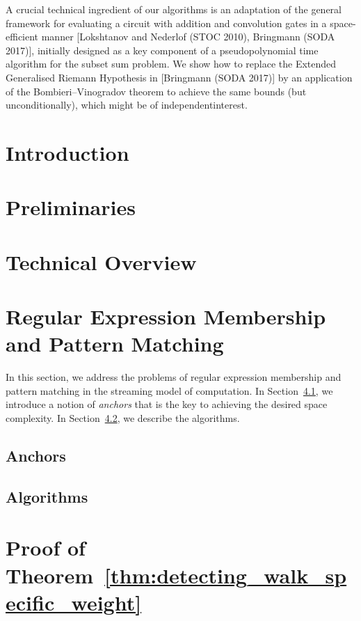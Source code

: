 \begin{small}
A crucial technical ingredient of our algorithms is an adaptation of the general framework for evaluating a circuit with addition and convolution gates in a space-efficient manner [Lokshtanov and Nederlof (STOC 2010), Bringmann (SODA 2017)], initially designed as a key component of a pseudopolynomial time algorithm for the subset sum problem. We show how to replace the Extended Generalised Riemann Hypothesis in [Bringmann (SODA 2017)] by an application of the Bombieri--Vinogradov theorem to achieve the same bounds (but unconditionally), which might be of independentinterest.
\end{small}

\section{Introduction}
\label{regexp:sec:introduction}


\section{Preliminaries}
\label{regexp:sec:prelim}


\section{Technical Overview}
\label{regexp:sec:overview}


\section{Regular Expression Membership and Pattern Matching}\label{sec:regexp}
In this section, we address the problems of regular expression membership and pattern matching in the streaming model of computation. In Section~\ref{regexp:sec:anchors}, we introduce a notion of \emph{anchors} that is the key to achieving the desired space complexity. In Section~\ref{regexp:sec:algorithms}, we describe the algorithms.

\subsection{Anchors}
\label{regexp:sec:anchors}


\subsection{Algorithms}
\label{regexp:sec:algorithms}


\section{Proof of Theorem~\ref{thm:detecting_walk_specific_weight}}
\label{regexp:sec:paths-in-graph}


\BiblatexSplitbibDefernumbersWarningOff

\backmatter
\printbibliography[segment=\therefsegment,heading=subbibintoc]